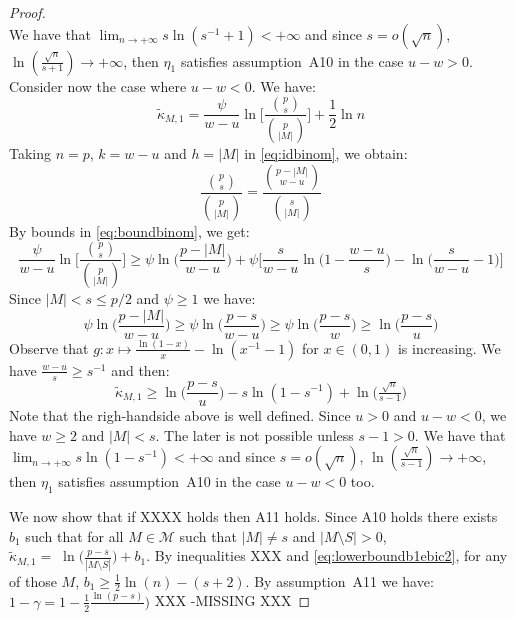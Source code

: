 \documentclass[aos]{imsart}
\theoremstyle{plain}
\newcommand{\M}{\mathcal{M}}
\begin{document}
\begin{proof}
\begin{equation}
\end{equation}
 We have that $\lim_{n\to+\infty}s\ln(s^{-1}+1)< +\infty$ and since $s=o(\sqrt{n})$, $\ln(\tfrac{\sqrt{n}}{s+1}) \to +\infty$, then $\eta_1$ satisfies assumption~A10 in the case $u-w>0$.\\
 Consider now the case where $u-w<0$. We have:
     \begin{equation*}
        \tilde{\kappa}_{M,1}=\frac{\psi}{w-u}\ln\bigg[\frac{\binom{p}{s}}{\binom{p}{|M|}}\bigg]+ \frac{1}{2}\ln n
    \end{equation*}
 Taking $n=p$, $k=w-u$ and $h=|M|$ in \eqref{eq:idbinom}, we obtain:
     \begin{equation}
        \frac{\binom{p}{s}}{\binom{p}{|M|}}=
        \frac{\binom{p - |M|}{w-u}}{\binom{s}{|M|}}
    \end{equation}
By bounds in \eqref{eq:boundbinom}, we get:
$$ \frac{\psi}{w-u}\ln\bigg[\frac{\binom{p}{s}}{\binom{p}{|M|}}\bigg] \geq \psi\ln\bigg(\frac{p-|M|}{w-u}\bigg)+\psi\bigg[\frac{s}{w-u}\ln\bigg(1-\frac{w-u}{s}\bigg) -\ln\bigg(\frac{s}{w-u}-1\bigg) \bigg]$$
Since $|M|<s\leq p/2$ and $\psi\geq 1$ we have:
$$\psi\ln\bigg(\frac{p-|M|}{w-u}\bigg) \geq \psi\ln\bigg(\frac{p-s}{w-u}\bigg) \geq \psi\ln\bigg(\frac{p-s}{w}\bigg)\geq \ln\bigg(\frac{p-s}{u}\bigg)$$
Observe that $g:x \mapsto \frac{\ln(1-x)}{x}-\ln({x}^{-1}-1)$ for $x\in(0,1)$ is increasing. We have $\frac{w-u}{s} \geq s^{-1}$ and then: 
\begin{equation}
        \tilde{\kappa}_{M,1} \geq \ln\big(\frac{p-s}{u}\big)-s\ln(1-s^{-1})+ \ln \big(\tfrac{\sqrt{n}}{s-1}\big)
\end{equation}
Note that the righ-handside above is well defined. Since $u>0$ and $u-w<0$, we have $w\geq2$ and $|M|<s$. The later is not possible unless $s-1>0$. We have that $\lim_{n\to+\infty}s\ln(1-s^{-1})< +\infty$ and since $s=o(\sqrt{n})$, $\ln(\tfrac{\sqrt{n}}{s-1}) \to +\infty$, then $\eta_1$ satisfies assumption~A10 in the case $u-w<0$ too.

 We now show that if XXXX holds then A11 holds. Since A10 holds there exists $b_1$ such that for all $M\in\M$ such that $|M|\neq s$ and $|M\setminus S|>0$, $\tilde{\kappa}_{M, 1} =\;\ln\bigg(\frac{p-s}{|M \setminus S| }\bigg) + b_{1}$. By inequalities XXX and \eqref{eq:lowerboundb1ebic2}, for any of those $M$, $b_1 \geq \tfrac{1}{2}\ln(n)-(s+2)$. By assumption~A11 we have: $1-\gamma=1-\frac{1}{2}\frac{\ln(p-s)}{})$ XXX -MISSING XXX
\end{proof}
\end{document}
